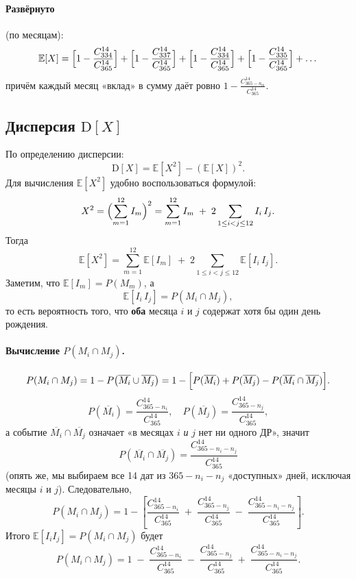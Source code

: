 \documentclass{article}
\begin{document}
\paragraph{Развёрнуто} (по месяцам):
\[
\mathbb{E}[X]
= \Bigl[1 - \frac{C_{334}^{14}}{C_{365}^{14}}\Bigr]
+ \Bigl[1 - \frac{C_{337}^{14}}{C_{365}^{14}}\Bigr]
+ \Bigl[1 - \frac{C_{334}^{14}}{C_{365}^{14}}\Bigr]
+ \Bigl[1 - \frac{C_{335}^{14}}{C_{365}^{14}}\Bigr]
+ \dots
\]
причём каждый месяц «вклад» в сумму даёт ровно \(1 - \frac{C_{365 - n_m}^{14}}{C_{365}^{14}}\).

\subsection*{Дисперсия \(\mathrm{D}[X]\)}

По определению дисперсии:
\[
\mathrm{D}[X]
= \mathbb{E}[X^2] - (\mathbb{E}[X])^2.
\]
Для вычисления \(\mathbb{E}[X^2]\) удобно воспользоваться формулой:
\[
X^2
= \Bigl(\sum_{m=1}^{12} I_m\Bigr)^2
= \sum_{m=1}^{12} I_m
\;+\; 2 \sum_{1 \le i < j \le 12} I_i\,I_j.
\]
Тогда
\[
\mathbb{E}[X^2]
= \sum_{m=1}^{12} \mathbb{E}[I_m]
\;+\;
2 \sum_{1 \le i < j \le 12} \mathbb{E}[I_i \, I_j].
\]
Заметим, что \(\mathbb{E}[I_m] = P(M_m)\), а
\[
\mathbb{E}[I_i \, I_j]
= P(M_i \cap M_j),
\]
то есть вероятность того, что \textbf{оба} месяца \(i\) и \(j\) содержат хотя бы один день рождения.

\paragraph{Вычисление \(P(M_i \cap M_j)\).}

\[
P(M_i \cap M_j)
= 1 - P\bigl(\overline{M_i} \cup \overline{M_j}\bigr)
= 1 - \Bigl[P(\overline{M_i}) + P(\overline{M_j}) - P(\overline{M_i} \cap \overline{M_j})\Bigr].
\]
\[
P(\overline{M_i}) = \frac{C_{365 - n_i}^{14}}{C_{365}^{14}},
\quad
P(\overline{M_j}) = \frac{C_{365 - n_j}^{14}}{C_{365}^{14}},
\]
а событие \(\overline{M_i} \cap \overline{M_j}\) означает «в месяцах \(i\) \emph{и} \(j\) нет ни одного ДР», значит
\[
P(\overline{M_i} \cap \overline{M_j})
= \frac{C_{365 - n_i - n_j}^{14}}{C_{365}^{14}}
\]
(опять же, мы выбираем все 14 дат из \(365 - n_i - n_j\) «доступных» дней, исключая месяцы \(i\) и \(j\)). Следовательно,
\[
P(M_i \cap M_j)
= 1 - \left[
\frac{C_{365 - n_i}^{14}}{C_{365}^{14}}
\;+\;
\frac{C_{365 - n_j}^{14}}{C_{365}^{14}}
\;-\;
\frac{C_{365 - n_i - n_j}^{14}}{C_{365}^{14}}
\right].
\]
Итого \(\mathbb{E}[I_i I_j] = P(M_i \cap M_j)\) будет
\[
P(M_i \cap M_j)
= 1
\;-\; \frac{C_{365 - n_i}^{14}}{C_{365}^{14}}
\;-\; \frac{C_{365 - n_j}^{14}}{C_{365}^{14}}
\;+\; \frac{C_{365 - n_i - n_j}^{14}}{C_{365}^{14}}.
\]
\end{document}
